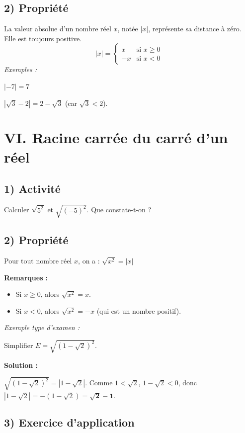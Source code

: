 \documentclass[12pt,a4paper]{article}
\begin{document}
\subsection*{\color{myred} 2) Propriété}
La valeur absolue d'un nombre réel $x$, notée $|x|$, représente sa distance à zéro. Elle est toujours positive.
\[
|x| = \begin{cases} x & \text{si } x \ge 0 \\ -x & \text{si } x < 0 \end{cases}
\]
\textit{Exemples :} 

$|-7| = 7$

$|\sqrt{3} - 2| = 2 - \sqrt{3}$ (car $\sqrt{3} < 2$).

\section*{\color{myred}VI. Racine carrée du carré d’un réel}

\subsection*{\color{myred} 1) Activité}
Calculer $\sqrt{5^2}$ et $\sqrt{(-5)^2}$. Que constate-t-on ?

\subsection*{\color{myred} 2) Propriété}
Pour tout nombre réel $x$, on a :
$\sqrt{x^2} = |x|$

\textbf{Remarques :} 
\begin{itemize}
    \item Si $x \ge 0$, alors $\sqrt{x^2} = x$.
    \item Si $x < 0$, alors $\sqrt{x^2} = -x$ (qui est un nombre positif).
\end{itemize}

\noindent \textit{Exemple type d'examen :}

Simplifier $E = \sqrt{(1 - \sqrt{2})^2}$.

\textbf{Solution :} 

$\sqrt{(1 - \sqrt{2})^2} = |1 - \sqrt{2}|$. Comme $1 < \sqrt{2}$, $1 - \sqrt{2} < 0$, donc $|1 - \sqrt{2}| = -(1 - \sqrt{2}) = \mathbf{\sqrt{2} - 1}$.
\subsection*{\color{myred} 3) Exercice d'application}
\end{document}
